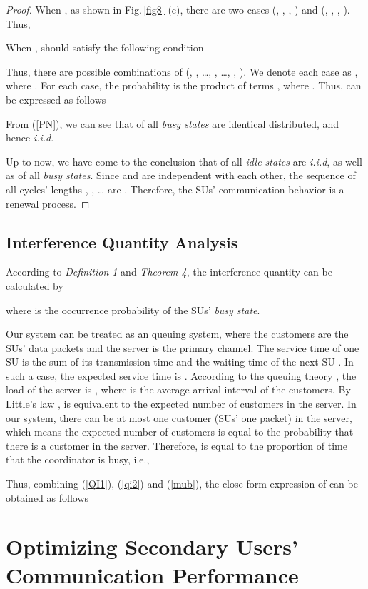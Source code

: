 \documentclass[11pt,draftcls]{IEEEtran}{\onecolumn}
\begin{document}
\begin{proof}
When , as shown in Fig.\,\ref{fig8}-(c), there are two cases
(, , , ) and (, , ,
). Thus,


When ,  should satisfy the following
condition

Thus, there are  possible combinations of (, ,
\dots, , \dots, , ). We denote each case as
, where . For each case, the probability is
the product of  terms , where . Thus,  can be expressed as follows

From (\ref{PN}), we can see that  of all \emph{busy states} are
identical distributed, and hence \emph{i.i.d}.

Up to now, we have come to the conclusion that  of all
\emph{idle states} are \emph{i.i.d}, as well as  of all
\emph{busy states}. Since  and  are independent with each
other, the sequence of all cycles' lengths , , \dots
are . Therefore, the SUs' communication behavior is a renewal
process.
\end{proof}

\subsection{Interference Quantity Analysis}
According to \emph{Definition 1} and \emph{Theorem 4}, the
interference quantity  can be calculated by

where 
is the occurrence probability of the SUs' \emph{busy state}.

Our system can be treated as an  queuing system, where the
customers are the SUs' data packets and the server is the primary
channel. The service time  of one SU is the sum of its
transmission time  and the waiting time of the next SU .
In such a case, the expected service time is . According to the queuing theory
\cite{queuing}, the load of the server is , where  is the average arrival interval of
the customers. By Little's law \cite{queuing},  is equivalent
to the expected number of customers in the server. In our system,
there can be at most one customer (SUs' one packet) in the server,
which means the expected number of customers is equal to the
probability that there is a customer in the server. Therefore,
 is equal to the proportion of time that the coordinator is
busy, i.e.,


Thus, combining (\ref{QI1}), (\ref{qi2}) and (\ref{mub}), the
close-form expression of  can be obtained as follows


\section{Optimizing Secondary Users' Communication Performance}\label{control}
\end{document}
